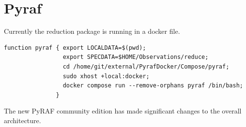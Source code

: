 \renewcommand{\footerfilename}{Pyraf.tex}

\section{Pyraf}

Currently the reduction package is running in a docker file.

\begin{tcolorbox}[title=Pyraf alias entry for bash]
\begin{verbatim}
function pyraf { export LOCALDATA=$(pwd);
                 export SPECDATA=$HOME/Observations/reduce;
                 cd /home/git/external/PyrafDocker/Compose/pyraf;
                 sudo xhost +local:docker;
                 docker compose run --remove-orphans pyraf /bin/bash;
               }
\end{verbatim}
\end{tcolorbox}

The new PyRAF community edition has made significant changes to the
overall architecture.


